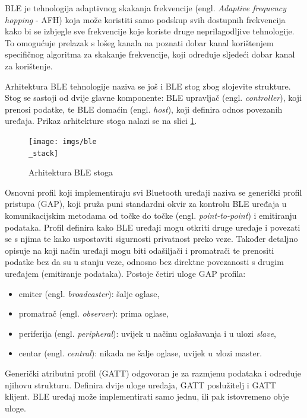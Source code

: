 BLE je tehnologija adaptivnog skakanja frekvencije (engl. \textit{Adaptive frequency hopping} - AFH) koja može koristiti samo podskup svih dostupnih frekvencija kako bi se izbjegle sve frekvencije koje koriste druge neprilagodljive tehnologije. To omogućuje prelazak s lošeg kanala na poznati dobar kanal korištenjem specifičnog algoritma za skakanje frekvencije, koji određuje sljedeći dobar kanal za korištenje. 

Arhitektura BLE tehnologije naziva se još i BLE stog zbog slojevite strukture. Stog se sastoji od dvije glavne komponente: BLE upravljač (engl. \textit{controller}), koji prenosi podatke, te BLE domaćin (engl. \textit{host}), koji definira odnos povezanih uređaja. Prikaz arhitekture stoga nalazi se na slici \ref{fig:ble_stack}.

\begin{figure}[ht]
	\centering
	\texttt{[image: imgs/ble\\\_stack]}
	\caption{Arhitektura BLE stoga \cite{espressif}}
	\label{fig:ble_stack}
\end{figure}

Osnovni profil koji implementiraju svi Bluetooth uređaji naziva se generički profil pristupa (GAP), koji pruža puni standardni okvir za kontrolu BLE uređaja u komunikacijskim metodama od točke do točke (engl. \textit{point-to-point}) i emitiranju podataka. Profil definira kako BLE uređaji mogu otkriti druge uređaje i povezati se s njima te kako uspostaviti sigurnosti privatnost preko veze. Također detaljno opisuje na koji način uređaji mogu biti odašiljači i promatrači te prenositi podatke bez da su u stanju veze, odnosno bez direktne povezanosti s drugim uređajem (emitiranje podataka). Postoje četiri uloge GAP profila:

\begin{itemize}
	\item emiter (engl. \textit{broadcaster}): šalje oglase,
	\item promatrač (engl. \textit{observer}): prima oglase,
	\item periferija (engl. \textit{peripheral}): uvijek u načinu oglašavanja i u ulozi \textit{slave}, 
	\item centar (engl. \textit{central}): nikada ne šalje oglase, uvijek u \textit ulozi {master}.
\end{itemize}

Generički atributni profil (GATT) odgovoran je za razmjenu podataka i određuje njihovu strukturu. Definira dvije uloge uređaja, GATT poslužitelj i GATT klijent. BLE uređaj može implementirati samo jednu, ili pak istovremeno obje uloge.

